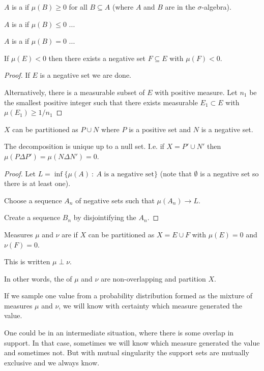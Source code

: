 \begin{definition}
  $A$ is a  if $\mu(B) \geq 0$ for all $B \subseteq A$ (where $A$ and $B$ are in the $\sigma$-algebra).

  $A$ is a  if $\mu(B) \leq 0$ ...

  $A$ is a  if $\mu(B) = 0$ ...
\end{definition}

\begin{theorem}
  If $\mu(E) < 0$ then there exists a negative set $F \subseteq E$ with $\mu(F) < 0$.
\end{theorem}

\begin{proof}
  If $E$ is a negative set we are done.


  Alternatively, there is a measurable subset of $E$ with positive measure. Let $n_1$ be the smallest positive
  integer such that there exists measurable $E_1 \subset E$ with $\mu(E_1) \geq 1/n_1$
\end{proof}

\begin{theorem}
  $X$ can be partitioned as $P \cup N$ where $P$ is a positive set and $N$ is a negative set.

  The decomposition is unique up to a null set. I.e. if $X = P' \cup N'$
  then $\mu(P \Delta P') = \mu(N \Delta N') = 0$.
\end{theorem}

\begin{proof}

  Let $L = \inf \{\mu(A) ~:~ A \text{~is a negative set}\}$ (note that $\emptyset$ is a negative set so there is at least one).

  Choose a sequence $A_n$ of negative sets such that $\mu(A_n) \to L$.

  Create a sequence $B_n$ by disjointifying the $A_n$.

\end{proof}

\begin{definition}
  Measures $\mu$ and $\nu$ are  if $X$ can be partitioned as $X = E \cup F$ with
  $\mu(E) = 0$ and $\nu(F) = 0$.

  This is written $\mu \perp \nu$.
\end{definition}

\begin{intuition*}
  In other words, the  of $\mu$ and $\nu$ are non-overlapping and partition $X$.

  If we sample one value from a probability distribution formed as the mixture of measures $\mu$ and $\nu$, we
  will know with certainty which measure generated the value.

  One could be in an intermediate situation, where there is some overlap in support. In that case,
  sometimes we will know which measure generated the value and sometimes not. But with mutual
  singularity the support sets are mutually exclusive and we always know.
\end{intuition*}

